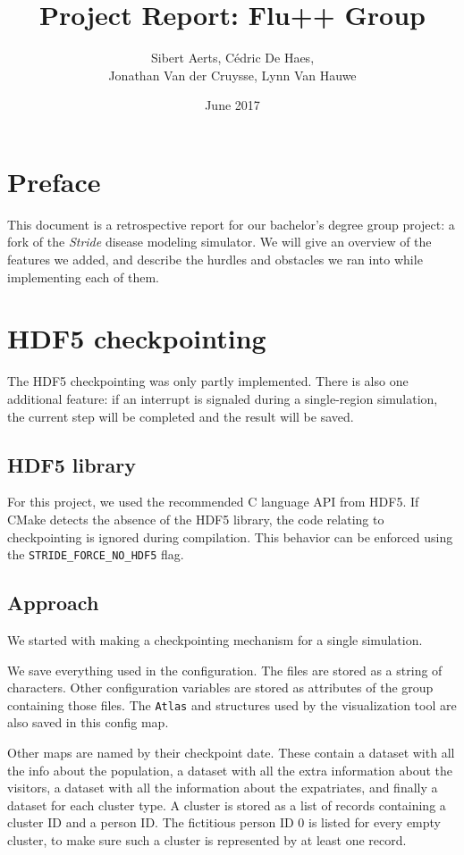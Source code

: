 \documentclass[a4paper,12pt]{article}
\title{Project Report: Flu++ Group}
\author{Sibert Aerts, C\'edric De Haes,\\ Jonathan Van der Cruysse, Lynn Van Hauwe}
\date{June 2017}
\begin{document}
\maketitle
\section*{Preface}
This document is a retrospective report for our bachelor's degree group project: a fork of the \emph{Stride} disease modeling simulator.  We will give an overview of the features we added, and describe the hurdles and obstacles we ran into while implementing each of them.

\tableofcontents
\pagebreak

\section{HDF5 checkpointing}
The HDF5 checkpointing was only partly implemented. There is also one additional feature: if an interrupt is signaled during a single-region simulation, the current step will be completed and the result will be saved.

\subsection{HDF5 library}
For this project, we used the recommended C language API from HDF5.
If CMake detects the absence of the HDF5 library, the code relating to checkpointing is ignored during compilation. This behavior can be enforced using the \texttt{STRIDE\_FORCE\_NO\_HDF5} flag.

\subsection{Approach}
We started with making a checkpointing mechanism for a single simulation.

We save everything used in the configuration. The files are stored as a string of characters. Other configuration variables are stored as attributes of the group containing those files. The \texttt{Atlas} and  structures used by the visualization tool are also saved in this config map.

Other maps are named by their checkpoint date. These contain a dataset with all the info about the population, a dataset with all the extra information about the visitors, a dataset with all the information about the expatriates, and finally a dataset for each cluster type. A cluster is stored as a list of records containing a cluster ID and a person ID. The fictitious person ID 0 is listed for every empty cluster, to make sure such a cluster is represented by at least one record.
\end{document}
